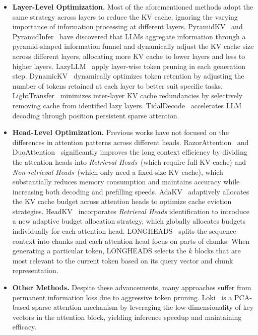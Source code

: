 \documentclass[11pt, a4paper, logo, copyright, nonumbering]{map}
\begin{document}
\begin{itemize}
    \item \textbf{Layer-Level Optimization.} Most of the aforementioned methods adopt the same strategy across layers to reduce the KV cache, ignoring the varying importance of information processing at different layers. PyramidKV~\cite{cai2024pyramidkvdynamickvcache} and PyramidInfer~\cite{yang-etal-2024-pyramidinfer} have discovered that LLMs aggregate information through a pyramid-shaped information funnel and dynamically adjust the KV cache size across different layers, allocating more KV cache to lower layers and less to higher layers. LazyLLM~\cite{fu2024lazyllmdynamictokenpruning} apply layer-wise token pruning in each generation step. DynamicKV~\cite{zhou2025dynamickvtaskawareadaptivekv} dynamically optimizes token retention by adjusting the number of tokens retained at each layer to better suit specific tasks. LightTransfer~\cite{zhang2025lighttransfer} minimizes inter-layer KV cache redundancies by selectively removing cache from identified lazy layers. TidalDecode~\cite{yang2024tidaldecodefastaccuratellm} accelerates LLM decoding through position persistent sparse attention.
    \item \textbf{Head-Level Optimization.} Previous works have not focused on the differences in attention patterns across different heads. RazorAttention~\cite{tang2025razorattention} and DuoAttention~\cite{xiao2024duoattentionefficientlongcontextllm} significantly improves the long context efficiency by dividing the attention heads into \textit{Retrieval Heads}~(which require full KV cache) and \textit{Non-retrieval Heads}~(which only need a fixed-size KV cache), which substantially reduces memory consumption and maintains accuracy while increasing both decoding and prefilling speeds. AdaKV~\cite{feng2025adakvoptimizingkvcache} adaptively allocates the KV cache budget across attention heads to optimize cache eviction strategies. HeadKV~\cite{fu2024headsmatterheadlevelkv} incorporates \textit{Retrieval Heads} identification to introduce a new adaptive budget allocation strategy, which globally allocates budgets individually for each attention head. LONGHEADS~\cite{lu2024longheadsmultiheadattentionsecretly4} splits the sequence context into chunks and each attention head focus on parts of chunks. When generating a particular token, LONGHEADS selects the $k$ blocks that are most relevant to the current token based on its query vector and chunk representation. 
    \item \textbf{Other Methods.} Despite these advancements, many approaches suffer from permanent information loss due to aggressive token pruning. Loki~\cite{NEURIPS2024_1e027da6} is a PCA-based sparse attention mechanism by leveraging the low-dimensionality of key vectors in the attention block, yielding inference speedup and maintaining efficacy.
\end{itemize}
\end{document}
